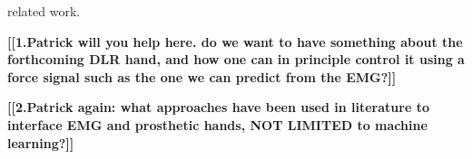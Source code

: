 related work.

\textbf{[[1.Patrick will you help here. do we want to have something
about the forthcoming DLR hand, and how one can in principle control
it using a force signal such as the one we can predict from the EMG?]]}

\textbf{[[2.Patrick again: what approaches have been used in
literature to interface EMG and prosthetic hands, NOT LIMITED to
machine learning?]]}

